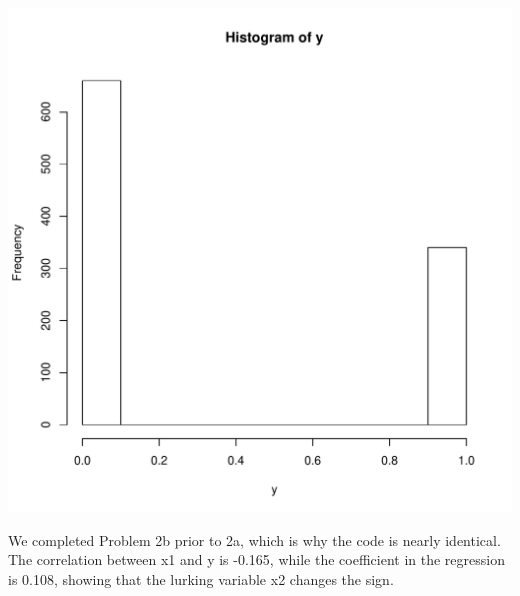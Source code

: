 \documentclass{article}\usepackage[]{graphicx}\usepackage[]{color}
\newenvironment{knitrout}{}{} %
\begin{document}
\begin{knitrout}
\includegraphics[width=5.5in]{figure/p2a-3} 

\end{knitrout}
\noindent We completed Problem 2b prior to 2a, which is why the code is nearly identical. The correlation between x1 and y is -0.165, while the coefficient in the regression is 0.108, showing that the lurking variable x2 changes the sign.\\
\end{document}
